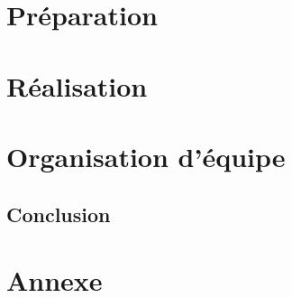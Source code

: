 \documentclass[a4paper, 11pt, oneside, oldfontcommands]{memoir}
\newcounter{rem}[chapter]
\begin{document}
% 
% 
% 
% 
% 

%
%


\part{Préparation}





\part{Réalisation}






\part{Organisation d'équipe}






\chapter*{Conclusion}
\newpage




\part*{Annexe}
\appendix
\nocite{*}
%
%
%








\newpage
 \listoffigures
 \printindex
 
  
\end{document}
